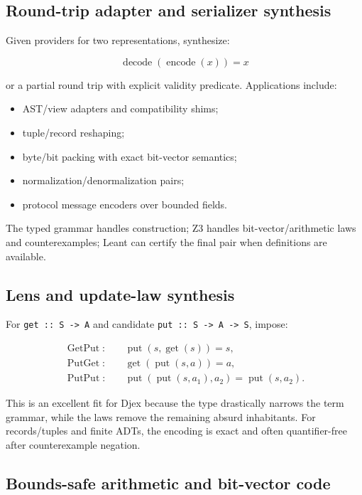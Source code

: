 \documentclass[11pt,oneside]{article}
\newcommand{\code}[1]{\texttt{#1}}
\begin{document}
\subsection{Round-trip adapter and serializer synthesis}

Given providers for two representations, synthesize:

\[
  \operatorname{decode}(\operatorname{encode}(x))=x
\]

or a partial round trip with explicit validity predicate. Applications include:

\begin{itemize}
  \item AST/view adapters and compatibility shims;
  \item tuple/record reshaping;
  \item byte/bit packing with exact bit-vector semantics;
  \item normalization/denormalization pairs;
  \item protocol message encoders over bounded fields.
\end{itemize}

The typed grammar handles construction; Z3 handles bit-vector/arithmetic laws and
counterexamples; Leant can certify the final pair when definitions are available.

\subsection{Lens and update-law synthesis}

For \code{get :: S -> A} and candidate \code{put :: S -> A -> S}, impose:

\[
\begin{aligned}
\operatorname{GetPut}:&\quad \operatorname{put}(s,\operatorname{get}(s))=s,\\
\operatorname{PutGet}:&\quad \operatorname{get}(\operatorname{put}(s,a))=a,\\
\operatorname{PutPut}:&\quad \operatorname{put}(\operatorname{put}(s,a_1),a_2)
 =\operatorname{put}(s,a_2).
\end{aligned}
\]

This is an excellent fit for Djex because the type drastically narrows the term grammar,
while the laws remove the remaining absurd inhabitants. For records/tuples and finite
ADTs, the encoding is exact and often quantifier-free after counterexample negation.

\subsection{Bounds-safe arithmetic and bit-vector code}
\end{document}
